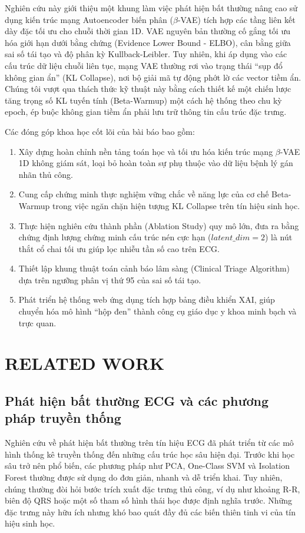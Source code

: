 \documentclass[conference]{IEEEtran}
\begin{document}
Nghiên cứu này giới thiệu một khung làm việc phát hiện bất thường nâng cao sử dụng kiến trúc mạng Autoencoder biến phân (\(\beta\)-VAE) tích hợp các tầng liên kết dày đặc tối ưu cho chuỗi thời gian 1D. VAE nguyên bản thường cố gắng tối ưu hóa giới hạn dưới bằng chứng (Evidence Lower Bound - ELBO), cân bằng giữa sai số tái tạo và độ phân kỳ Kullback-Leibler. Tuy nhiên, khi áp dụng vào các cấu trúc dữ liệu chuỗi liên tục, mạng VAE thường rơi vào trạng thái ``sụp đổ không gian ẩn'' (KL Collapse), nơi bộ giải mã tự động phớt lờ các vector tiềm ẩn. Chúng tôi vượt qua thách thức kỹ thuật này bằng cách thiết kế một chiến lược tăng trọng số KL tuyến tính (Beta-Warmup) một cách hệ thống theo chu kỳ epoch, ép buộc không gian tiềm ẩn phải lưu trữ thông tin cấu trúc đặc trưng.

Các đóng góp khoa học cốt lõi của bài báo bao gồm:
\begin{enumerate}
\item Xây dựng hoàn chỉnh nền tảng toán học và tối ưu hóa kiến trúc mạng \(\beta\)-VAE 1D không giám sát, loại bỏ hoàn toàn sự phụ thuộc vào dữ liệu bệnh lý gán nhãn thủ công.
\item Cung cấp chứng minh thực nghiệm vững chắc về năng lực của cơ chế Beta-Warmup trong việc ngăn chặn hiện tượng KL Collapse trên tín hiệu sinh học.
\item Thực hiện nghiên cứu thành phần (Ablation Study) quy mô lớn, đưa ra bằng chứng định lượng chứng minh cấu trúc nén cực hạn (\(latent\_dim=2\)) là nút thắt cổ chai tối ưu giúp lọc nhiễu tần số cao trên ECG.
\item Thiết lập khung thuật toán cảnh báo lâm sàng (Clinical Triage Algorithm) dựa trên ngưỡng phân vị thứ 95 của sai số tái tạo.
\item Phát triển hệ thống web ứng dụng tích hợp bảng điều khiển XAI, giúp chuyển hóa mô hình ``hộp đen'' thành công cụ giáo dục y khoa minh bạch và trực quan.
\end{enumerate}

\section{RELATED WORK}
\subsection{Phát hiện bất thường ECG và các phương pháp truyền thống}
Nghiên cứu về phát hiện bất thường trên tín hiệu ECG đã phát triển từ các mô hình thống kê truyền thống đến những cấu trúc học sâu hiện đại. Trước khi học sâu trở nên phổ biến, các phương pháp như PCA, One-Class SVM và Isolation Forest thường được sử dụng do đơn giản, nhanh và dễ triển khai. Tuy nhiên, chúng thường đòi hỏi bước trích xuất đặc trưng thủ công, ví dụ như khoảng R-R, biên độ QRS hoặc một số tham số hình thái học được định nghĩa trước. Những đặc trưng này hữu ích nhưng khó bao quát đầy đủ các biến thiên tinh vi của tín hiệu sinh học.
\end{document}
